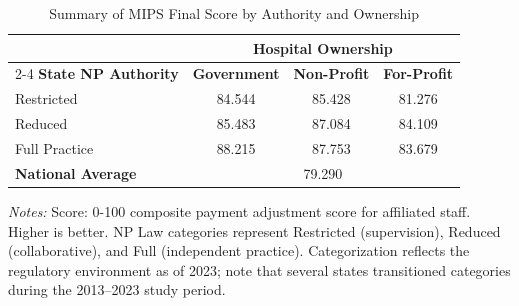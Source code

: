 \begin{table}[htbp]
    \centering
    \caption{Summary of MIPS Final Score by Authority and Ownership}
    \label{tab:mips_final_score}
    \vspace{0.2cm}
    \begin{tabular}{lccc}
        \toprule
        & \multicolumn{3}{c}{\textbf{Hospital Ownership}} \\
        \cmidrule(lr){2-4}
        \textbf{State NP Authority} & \textbf{Government} & \textbf{Non-Profit} & \textbf{For-Profit} \\
        \midrule
        Restricted & 84.544 & 85.428 & 81.276 \\
        Reduced & 85.483 & 87.084 & 84.109 \\
        Full Practice & 88.215 & 87.753 & 83.679 \\
        \midrule
        \textbf{National Average} & \multicolumn{3}{c}{79.290} \\
        \bottomrule
    \end{tabular}
    \vspace{0.1cm}
    \begin{minipage}{0.85\textwidth}
        \footnotesize \textit{Notes:} Score: 0-100 composite payment adjustment score for affiliated staff. Higher is better. NP Law categories represent Restricted (supervision), Reduced (collaborative), and Full (independent practice). Categorization reflects the regulatory environment as of 2023; note that several states transitioned categories during the 2013--2023 study period.
    \end{minipage}
\end{table}